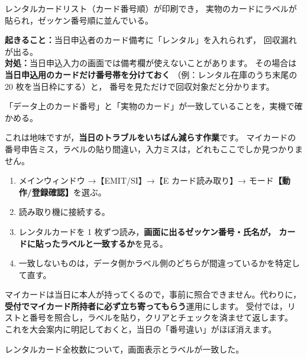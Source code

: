 \begin{Done}
レンタルカードリスト（カード番号順）が印刷でき，
実物のカードにラベルが貼られ，ゼッケン番号順に並んでいる。
\end{Done}

\begin{Fail}
\textbf{起きること：}当日申込者のカード備考に「レンタル」を入れられず，
回収漏れが出る。\\
\textbf{対処：}当日申込入力の画面では備考欄が使えないことがあります。
その場合は\textbf{当日申込用のカードだけ番号帯を分けておく}
（例：レンタル在庫のうち末尾の 20 枚を当日枠にする）と，
番号を見ただけで回収対象だと分かります。
\end{Fail}


\begin{Goal}
「データ上のカード番号」と「実物のカード」が一致していることを，実機で確かめる。
\end{Goal}

これは地味ですが，\textbf{当日のトラブルをいちばん減らす作業}です。
マイカードの番号申告ミス，ラベルの貼り間違い，入力ミスは，どれもここでしか見つかりません。

\begin{enumerate}
\item メインウィンドウ →【EMIT/SI】→【E カード読み取り】→
      モード\textbf{【動作/登録確認】}を選ぶ。\ver
\item 読み取り機に接続する。
\item レンタルカードを 1 枚ずつ読み，\textbf{画面に出るゼッケン番号・氏名が，
      カードに貼ったラベルと一致するか}を見る。
\item 一致しないものは，データ側かラベル側のどちらが間違っているかを特定して直す。
\end{enumerate}

\begin{Note}[マイカードの照合をどうするか]
マイカードは当日に本人が持ってくるので，事前に照合できません。代わりに，
\textbf{受付でマイカード所持者に必ず立ち寄ってもらう}運用にします。
受付では，リストと番号を照合し，ラベルを貼り，クリアとチェックを済ませて返します。
これを大会案内に明記しておくと，当日の「番号違い」がほぼ消えます。
\end{Note}

\begin{Done}
レンタルカード全枚数について，画面表示とラベルが一致した。
\end{Done}

